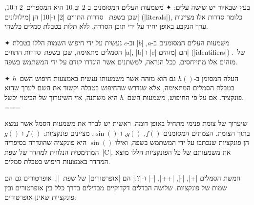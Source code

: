 בעץ שבאיור יש שישה עלים:
✦ משמעות העלים המסומנים ב-$2$ וב-$10$ היא המספרים~$2$ ו-$10$, שכן בשפת~\CPL
סדרות התווים \T|2| ו-\T|10| הן \ע|מילולונים| (\E|literals|), כלומר סדרות אלו
מציינות ערך הנקבע באופן יחיד על ידי תוכן הסדרה, ללא תלות בטבלת סמלים כלשהי.

✦ משמעות העלים המסומנים ב-$a$, \E|$b$| וב-$c$ נעשית על ידי חיפוש השמות הללו
בטבלת הסמלים מתאימה, שכן בשפת~\CPL סדרות התווים \T|a|, \T|b| ו-\T|c| הם
\ע|מזהים| (\E|identifiers|) של~\CPL. מזהים אלו מתייחסים, ככל הנראה, למשתנים אשר
הוגדרו קודם על ידי המשתמש בשפה.

✦ העלה המסומן ב-$h()$ גם הוא מזהה אשר משמעותו נעשית באמצעות חיפוש השם~$h$ בטבלת
הסמלים המתאימה, אלא שנדרש שהחיפוש בטבלה יקשור את השם לערך שהוא פונקציה.
אם על פי החיפוש, משמעות השם~$h$ היא משתנה, אזי השיערוך של הביטוי יכשל.
===

שיערוך של צומת פנימי מתחיל באופן דומה. ראשית יש לברר את משמעות הסמל אשר
נמצא בתוך הצומת. הצמתים המסומנים $f()$, $g()$, ו-$\sin()$, מציינים 
פונקציות: $f()$ ו-$g()$ הן פונקציות שנכתבו על ידי המשתמש בשפה, ואילו $\sin()$
היא פונקציה שהוגדרה בסיפריה המתימטית הנלווית למהדר של שפת~\E|C|. את משמעותם
של כל הפונקציות הללו מוצא המהדר באמצעות חיפוש בטבלת סמלים.

חמשת הסמלים \T|+|, \T|-|, \T|++|, \T|--| ו-\T|?:| הם \ע|אופרטורים| של
שפת~\E|\CPL|.  אופרטורים גם הם שמות של פונקציות. שלושה הבדלים דקדוקיים מבדילים
בדרך כלל בין אופרטורים ובין פונקציות שאינן אופרטורים:

